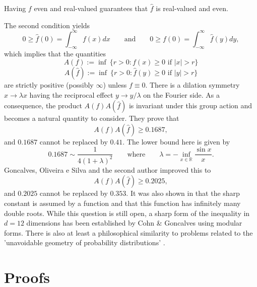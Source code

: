\documentclass{amsart}
\theoremstyle{remark}
\begin{document}
Having $f$ even and real-valued guarantees that $\widehat{f}$ is real-valued and even. {The second condition yields
$$ 0 \geq \widehat{f}(0)  = \int_{-\infty}^\infty{f(x)dx} \qquad \mbox{and} \qquad 0 \geq f(0) = \int_{-\infty}^\infty{\widehat{f}(y)dy},$$
which implies that the quantities
$$A(f):=\inf~\{r>0: f(x)\geq 0 \textrm{ if } |x|>r\}$$
$$A(\widehat{f}):=\inf~\{r>0: \widehat{f}(y)\geq 0 \textrm{ if } |y|>r\}$$
are strictly positive (possibly $\infty$) unless $f \equiv 0$. There is a dilation
symmetry $x \rightarrow \lambda x$ having the reciprocal effect $y \rightarrow y/\lambda$ on the Fourier side. As a consequence, the product $A(f)A(\widehat{f})$ is
invariant under this group action and becomes a natural quantity to consider. They prove that
$$A(f)A(\widehat{f}) \geq 0.1687,$$
and $0.1687$ cannot be replaced by $0.41$. The lower bound here is given by
$$ 0.1687 \sim \frac{1}{4(1+\lambda)^2} \qquad \mbox{where} \qquad \lambda = -\inf_{x \in \mathbb{R}}{\frac{\sin{x}}{x}}.$$
Goncalves, Oliveira e Silva and the second author  \cite{felipe1} improved this to
$$A(f)A(\widehat{f})\geq 0.2025, $$
and $0.2025$ cannot be replaced by $0.353$. It was also shown in \cite{felipe1} that the sharp constant is assumed by a function and that this function has infinitely many double roots. While this question is still open, a sharp form of the inequality in $d=12$ dimensions has been established by Cohn \& Goncalves \cite{cohn} using modular forms. There is also at least a philosophical similarity to problems related to the 'unavoidable geometry of probability distributions' \cite{alon, dong, feige, feldheim, schultze, steini}.




\section{Proofs}

}
\end{document}
